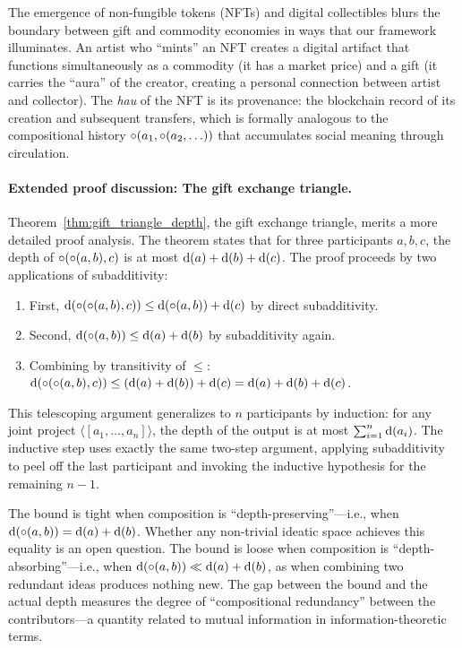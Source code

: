 The emergence of non-fungible tokens (NFTs) and digital collectibles
blurs the boundary between gift and commodity economies in ways that
our framework illuminates.  An artist who ``mints'' an NFT creates a
digital artifact that functions simultaneously as a commodity (it has a
market price) and a gift (it carries the ``aura'' of the creator,
creating a personal connection between artist and collector).  The
\textit{hau} of the NFT is its provenance: the blockchain record of
its creation and subsequent transfers, which is formally analogous to
the compositional history $\circ(a_1, \circ(a_2, \ldots))$ that
accumulates social meaning through circulation.

\paragraph{Extended proof discussion: The gift exchange triangle.}
Theorem~\ref{thm:gift_triangle_depth}, the gift exchange triangle,
merits a more detailed proof analysis.  The theorem states that for
three participants $a, b, c$, the depth of $\circ(\circ(a, b),
c)$ is at most $\operatorname{d}(a) + \operatorname{d}(b) + \operatorname{d}(c)$.  The proof
proceeds by two applications of subadditivity:
\begin{enumerate}
  \item First, $\operatorname{d}(\circ(\circ(a, b), c)) \le
    \operatorname{d}(\circ(a, b)) + \operatorname{d}(c)$ by direct subadditivity.
  \item Second, $\operatorname{d}(\circ(a, b)) \le \operatorname{d}(a) + \operatorname{d}(b)$
    by subadditivity again.
  \item Combining by transitivity of $\le$:
    $\operatorname{d}(\circ(\circ(a, b), c)) \le
    (\operatorname{d}(a) + \operatorname{d}(b)) + \operatorname{d}(c) =
    \operatorname{d}(a) + \operatorname{d}(b) + \operatorname{d}(c)$.
\end{enumerate}
This telescoping argument generalizes to $n$ participants by induction:
for any joint project $\langle [a_1, \ldots, a_n] \rangle$, the depth
of the output is at most $\sum_{i=1}^n \operatorname{d}(a_i)$.  The inductive
step uses exactly the same two-step argument, applying subadditivity to
peel off the last participant and invoking the inductive hypothesis for
the remaining $n-1$.

The bound is tight when composition is ``depth-preserving''---i.e., when
$\operatorname{d}(\circ(a, b)) = \operatorname{d}(a) + \operatorname{d}(b)$.  Whether any
non-trivial ideatic space achieves this equality is an open question.
The bound is loose when composition is ``depth-absorbing''---i.e., when
$\operatorname{d}(\circ(a, b)) \ll \operatorname{d}(a) + \operatorname{d}(b)$, as when combining
two redundant ideas produces nothing new.  The gap between the bound and
the actual depth measures the degree of ``compositional redundancy''
between the contributors---a quantity related to mutual information in
information-theoretic terms.

